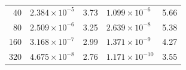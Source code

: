 \documentclass[10pt]{beamer}
\begin{document}
\begin{frame}
\begin{table}
\begin{tabular}{r*{4}l}
      40    & \( 2.384 \times 10^{ -5} \)   & 3.73                          & \( 1.099 \times 10^{ -6} \) & 5.66  \\
      80    & \( 2.509 \times 10^{ -6} \)   & 3.25                          & \( 2.639 \times 10^{ -8} \) & 5.38  \\
      160   & \( 3.168 \times 10^{ -7} \)   & 2.99                          & \( 1.371 \times 10^{ -9} \) & 4.27  \\
      320   & \( 4.675 \times 10^{ -8} \)   & 2.76                          & \( 1.171 \times 10^{-10} \) & 3.55  \\
      \bottomrule
    \end{tabular}
  \end{table}
\end{frame}
\end{document}
